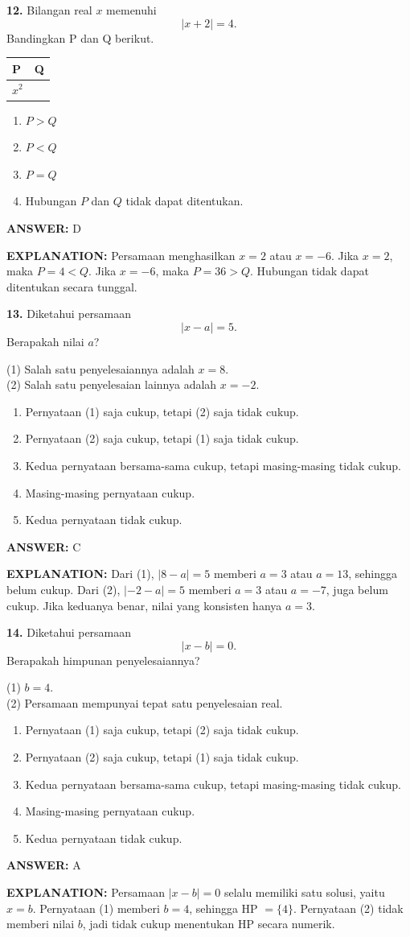 \documentclass[11pt,a4paper]{article}
\newcommand{\answer}[1]{\par\medskip\textbf{\color{jawab}ANSWER:} #1\par}
\newcommand{\explanation}[1]{\textbf{\color{jelas}EXPLANATION:} #1\par\medskip}
\newcommand{\question}[1]{\Needspace{8\baselineskip}\par\medskip\textbf{#1}\quad}
\newenvironment{choices}{\begin{enumerate}[label=\Alph*.,leftmargin=1.8em]}{\end{enumerate}}
\begin{document}
\question{12.} Bilangan real $x$ memenuhi
\[
|x+2|=4.
\]
Bandingkan P dan Q berikut.
\begin{center}
\begin{tabular}{|>{\centering\arraybackslash}p{}|>{\centering\arraybackslash}p{}|}
\hline
\textbf{P} & \textbf{Q} \\
\hline
$x^2$ & 9 \\
\hline
\end{tabular}
\end{center}
\begin{choices}
\item $P>Q$
\item $P<Q$
\item $P=Q$
\item Hubungan $P$ dan $Q$ tidak dapat ditentukan.
\end{choices}
\answer{D}
\explanation{Persamaan menghasilkan $x=2$ atau $x=-6$. Jika $x=2$, maka $P=4<Q$. Jika $x=-6$, maka $P=36>Q$. Hubungan tidak dapat ditentukan secara tunggal.}

\question{13.} Diketahui persamaan
\[
|x-a|=5.
\]
Berapakah nilai $a$?

(1) Salah satu penyelesaiannya adalah $x=8$.\\
(2) Salah satu penyelesaian lainnya adalah $x=-2$.
\begin{choices}
\item Pernyataan (1) saja cukup, tetapi (2) saja tidak cukup.
\item Pernyataan (2) saja cukup, tetapi (1) saja tidak cukup.
\item Kedua pernyataan bersama-sama cukup, tetapi masing-masing tidak cukup.
\item Masing-masing pernyataan cukup.
\item Kedua pernyataan tidak cukup.
\end{choices}
\answer{C}
\explanation{Dari (1), $|8-a|=5$ memberi $a=3$ atau $a=13$, sehingga belum cukup. Dari (2), $|-2-a|=5$ memberi $a=3$ atau $a=-7$, juga belum cukup. Jika keduanya benar, nilai yang konsisten hanya $a=3$.}

\question{14.} Diketahui persamaan
\[
|x-b|=0.
\]
Berapakah himpunan penyelesaiannya?

(1) $b=4$.\\
(2) Persamaan mempunyai tepat satu penyelesaian real.
\begin{choices}
\item Pernyataan (1) saja cukup, tetapi (2) saja tidak cukup.
\item Pernyataan (2) saja cukup, tetapi (1) saja tidak cukup.
\item Kedua pernyataan bersama-sama cukup, tetapi masing-masing tidak cukup.
\item Masing-masing pernyataan cukup.
\item Kedua pernyataan tidak cukup.
\end{choices}
\answer{A}
\explanation{Persamaan $|x-b|=0$ selalu memiliki satu solusi, yaitu $x=b$. Pernyataan (1) memberi $b=4$, sehingga HP $=\{4\}$. Pernyataan (2) tidak memberi nilai $b$, jadi tidak cukup menentukan HP secara numerik.}
\end{document}

